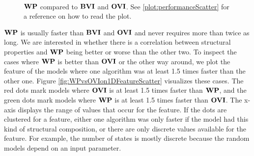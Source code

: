 \begin{figure}[h!]
    \centering
    \
    \caption{$\mathbf{WP}$ compared to $\mathbf{BVI}$ and $\mathbf{OVI}$. See \ref{plot:performanceScatter} for a reference on how to read the plot.}%
    \label{fig:WPvsBVIvsOVI}%
    \end{figure}
\FloatBarrier

$\mathbf{WP}$ is usually faster than $\mathbf{BVI}$ and $\mathbf{OVI}$ and never requires more than twice as long.
We are interested in whether there is a correlation between structural properties and $\mathbf{WP}$ being better or worse than the other two.
To inspect the cases where $\mathbf{WP}$ is better than $\mathbf{OVI}$ or the other way around, we plot the feature of the models where one algorithm was at least
1.5 times faster than the other one. Figure \ref{fig:WPvsOVIon1DFeatureScatter} visualizes these cases. 
The red dots mark models where $\mathbf{OVI}$ is at least 1.5 times faster than $\mathbf{WP}$, and the green dots mark models where $\mathbf{WP}$ is at least 1.5 times faster than $\mathbf{OVI}$.
The x-axis displays the range of values that occur for the feature. 
If the dots are clustered for a feature, either one algorithm was only faster if the model had this kind of structural composition, 
or there are only discrete values available for the feature. For example, the number of states is mostly discrete because the random models depend on an input parameter.

